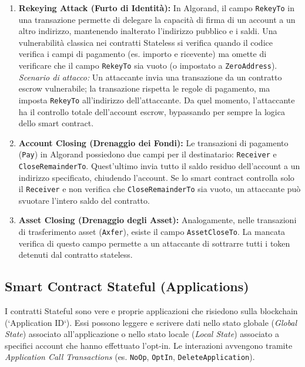 \begin{enumerate}
    \item \textbf{Rekeying Attack (Furto di Identità):} 
    In Algorand, il campo \texttt{RekeyTo} in una transazione permette di delegare la capacità di firma di un account a un altro indirizzo, mantenendo inalterato l'indirizzo pubblico e i saldi. 
    Una vulnerabilità classica nei contratti Stateless si verifica quando il codice verifica i campi di pagamento (es. importo e ricevente) ma omette di verificare che il campo \texttt{RekeyTo} sia vuoto (o impostato a \texttt{ZeroAddress}).
    \textit{Scenario di attacco:} Un attaccante invia una transazione da un contratto escrow vulnerabile; la transazione rispetta le regole di pagamento, ma imposta \texttt{RekeyTo} all'indirizzo dell'attaccante. Da quel momento, l'attaccante ha il controllo totale dell'account escrow, bypassando per sempre la logica dello smart contract.
    
    \item \textbf{Account Closing (Drenaggio dei Fondi):}
    Le transazioni di pagamento (\texttt{Pay}) in Algorand possiedono due campi per il destinatario: \texttt{Receiver} e \texttt{CloseRemainderTo}. Quest'ultimo invia tutto il saldo residuo dell'account a un indirizzo specificato, chiudendo l'account. Se lo smart contract controlla solo il \texttt{Receiver} e non verifica che \texttt{CloseRemainderTo} sia vuoto, un attaccante può svuotare l'intero saldo del contratto.
    
    \item \textbf{Asset Closing (Drenaggio degli Asset):}
    Analogamente, nelle transazioni di trasferimento asset (\texttt{Axfer}), esiste il campo \texttt{AssetCloseTo}. La mancata verifica di questo campo permette a un attaccante di sottrarre tutti i token detenuti dal contratto stateless.
\end{enumerate}

\subsection{Smart Contract Stateful (Applications)}
I contratti Stateful sono vere e proprie applicazioni che risiedono sulla blockchain (`Application ID`). Essi possono leggere e scrivere dati nello stato globale (\textit{Global State}) associato all'applicazione o nello stato locale (\textit{Local State}) associato a specifici account che hanno effettuato l'opt-in.
Le interazioni avvengono tramite \textit{Application Call Transactions} (es. \texttt{NoOp}, \texttt{OptIn}, \texttt{DeleteApplication}).

